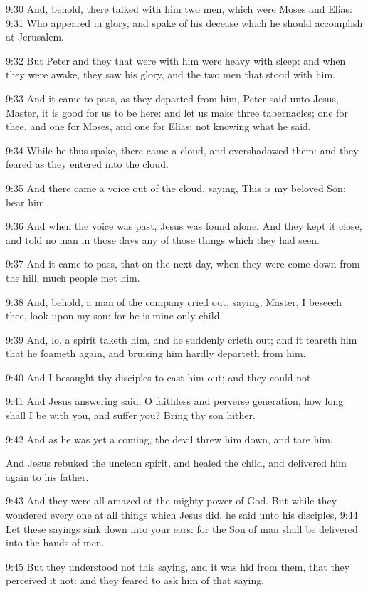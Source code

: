 9:30 And, behold, there talked with him two men, which were Moses and
Elias: 9:31 Who appeared in glory, and spake of his decease which he
should accomplish at Jerusalem.

9:32 But Peter and they that were with him were heavy with sleep: and
when they were awake, they saw his glory, and the two men that stood
with him.

9:33 And it came to pass, as they departed from him, Peter said unto
Jesus, Master, it is good for us to be here: and let us make three
tabernacles; one for thee, and one for Moses, and one for Elias: not
knowing what he said.

9:34 While he thus spake, there came a cloud, and overshadowed them:
and they feared as they entered into the cloud.

9:35 And there came a voice out of the cloud, saying, This is my
beloved Son: hear him.

9:36 And when the voice was past, Jesus was found alone. And they kept
it close, and told no man in those days any of those things which they
had seen.

9:37 And it came to pass, that on the next day, when they were come
down from the hill, much people met him.

9:38 And, behold, a man of the company cried out, saying, Master, I
beseech thee, look upon my son: for he is mine only child.

9:39 And, lo, a spirit taketh him, and he suddenly crieth out; and it
teareth him that he foameth again, and bruising him hardly departeth
from him.

9:40 And I besought thy disciples to cast him out; and they could not.

9:41 And Jesus answering said, O faithless and perverse generation,
how long shall I be with you, and suffer you? Bring thy son hither.

9:42 And as he was yet a coming, the devil threw him down, and tare
him.

And Jesus rebuked the unclean spirit, and healed the child, and
delivered him again to his father.

9:43 And they were all amazed at the mighty power of God. But while
they wondered every one at all things which Jesus did, he said unto
his disciples, 9:44 Let these sayings sink down into your ears: for
the Son of man shall be delivered into the hands of men.

9:45 But they understood not this saying, and it was hid from them,
that they perceived it not: and they feared to ask him of that saying.

